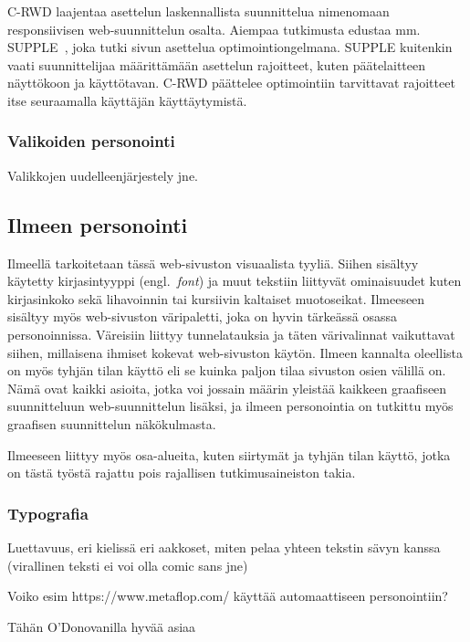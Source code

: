 \documentclass[finnish, 12pt, a4paper, elec, utf8, a-1b, online]{aaltothesis}
\begin{document}
C-RWD laajentaa asettelun laskennallista suunnittelua nimenomaan responsiivisen
web-suunnittelun osalta. Aiempaa tutkimusta edustaa mm.
SUPPLE~\cite{10.1145/964442.964461}, joka tutki sivun asettelua
optimointiongelmana. SUPPLE kuitenkin vaati suunnittelijaa määrittämään
asettelun rajoitteet, kuten päätelaitteen näyttökoon ja käyttötavan. C-RWD
päättelee optimointiin tarvittavat rajoitteet itse seuraamalla käyttäjän
käyttäytymistä.

\subsubsection{Valikoiden personointi}\label{menus}

Valikkojen uudelleenjärjestely jne.

\subsection{Ilmeen personointi}

Ilmeellä tarkoitetaan tässä web-sivuston visuaalista tyyliä. Siihen sisältyy
käytetty kirjasintyyppi (engl.\ \textit{font}) ja muut tekstiin liittyvät
ominaisuudet kuten kirjasinkoko sekä lihavoinnin tai kursiivin kaltaiset
muotoseikat. Ilmeeseen sisältyy myös web-sivuston väripaletti, joka on hyvin
tärkeässä osassa personoinnissa. Väreisiin liittyy tunnelatauksia ja täten
värivalinnat vaikuttavat siihen, millaisena ihmiset kokevat web-sivuston
käytön. Ilmeen kannalta oleellista on myös tyhjän tilan käyttö eli se kuinka
paljon tilaa sivuston osien välillä on. Nämä ovat kaikki asioita, jotka voi
jossain määrin yleistää kaikkeen graafiseen suunnitteluun web-suunnittelun
lisäksi, ja ilmeen personointia on tutkittu myös graafisen suunnittelun
näkökulmasta.

Ilmeeseen liittyy myös osa-alueita, kuten siirtymät ja tyhjän tilan käyttö,
jotka on tästä työstä rajattu pois rajallisen tutkimusaineiston takia.

\subsubsection{Typografia}

Luettavuus, eri kielissä eri aakkoset, miten pelaa yhteen tekstin sävyn kanssa
(virallinen teksti ei voi olla comic sans jne)

Voiko esim https://www.metaflop.com/ käyttää automaattiseen personointiin?

Tähän O'Donovanilla hyvää asiaa
\end{document}
